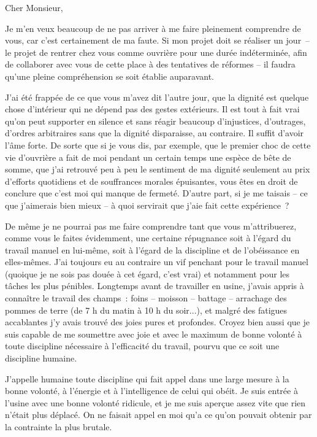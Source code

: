 \documentclass[french,twoside]{book} %
\begin{document}
\noindent \par
Cher Monsieur,\par
Je m'en veux beaucoup de ne pas arriver à me faire pleinement comprendre de vous, car c'est certainement de ma faute. Si mon projet doit se réaliser un jour – le projet de rentrer chez vous comme ouvrière pour une durée indéterminée, afin de collaborer avec vous de cette place à des tentatives de réformes – il faudra qu'une pleine compréhension se soit établie auparavant.\par
J'ai été frappée de ce que vous m'avez dit l'autre jour, que la dignité est quelque chose d'intérieur qui ne dépend pas des gestes extérieurs. Il est tout à fait vrai qu'on peut supporter en silence et sans réagir beaucoup d'injustices, d'outrages, d'ordres arbitraires sans que la dignité disparaisse, au contraire. Il suffit d'avoir l'âme forte. De sorte que si je vous dis, par exemple, que le premier choc de cette vie d'ouvrière a fait de moi pendant un certain temps une espèce de bête de somme, que j'ai retrouvé peu à peu le sentiment de ma dignité seulement au prix d'efforts quotidiens et de souffrances morales épuisantes, vous êtes en droit de conclure que c'est moi qui manque de fermeté. D'autre part, si je me taisais – ce que j'aimerais bien mieux – à quoi servirait que j’aie fait cette expérience ?\par
De même je ne pourrai pas me faire comprendre tant que vous m'attribuerez, comme vous le faites évidemment, une certaine répugnance soit à l'égard du travail manuel en lui-même, soit à l'égard de la discipline et de l'obéissance en elles-mêmes. J'ai toujours eu au contraire un vif penchant pour le travail manuel (quoique je ne sois pas douée à cet égard, c'est vrai) et notamment pour les tâches les plus pénibles. Longtemps avant de travailler en usine, j'avais appris à connaître le travail des champs : foins – moisson – battage – arrachage des pommes de terre (de 7 h du matin à 10 h du soir...), et malgré des fatigues accablantes j'y avais trouvé des joies pures et profondes. Croyez bien aussi que je suis capable de me soumettre avec joie et avec le maximum de bonne volonté à toute discipline nécessaire à l'efficacité du travail, pourvu que ce soit une discipline humaine.\par
J'appelle humaine toute discipline qui fait appel dans une large mesure à la bonne volonté, à l'énergie et à l'intelligence de celui qui obéit. Je suis entrée à l'usine avec une bonne volonté ridicule, et je me suis aperçue assez vite que rien n'était plus déplacé. On ne faisait appel en moi qu’a ce qu’on pouvait obtenir par la contrainte la plus brutale.\par
\end{document}

